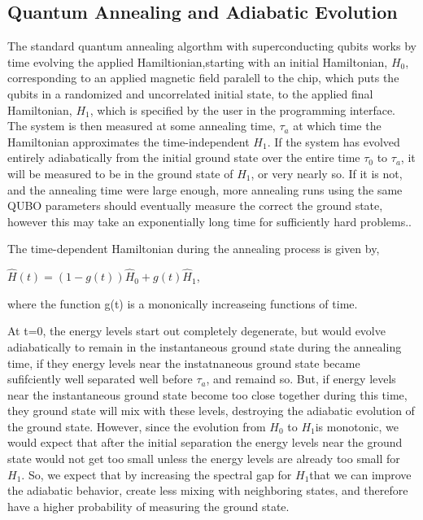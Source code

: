 \documentclass{article}
\begin{document}
\subsection*{Quantum Annealing and Adiabatic Evolution}

The standard quantum annealing algorthm with superconducting qubits works by time evolving the applied Hamiltionian,starting with an initial Hamiltonian,
\(H_0\), corresponding to an applied magnetic field paralell to the chip, which puts the { }qubits in a randomized and uncorrelated initial state,
to the applied final Hamiltonian, \(H_1\), which is specified by the user in the programming interface. The system is then measured at some annealing
time, \(\tau _a\) at which time the Hamiltonian approximates the time-independent \(H_1\). If the system has evolved entirely adiabatically from
the initial ground state over the entire time \(\tau _{0 }\) to \(\tau _a\), it will be measured to be in the ground state of \(H_1\), or very nearly
so. { }If it is not, and the annealing time were large enough, more annealing runs using the same QUBO parameters should eventually measure the correct
the ground state, however this may take an exponentially long time for sufficiently hard problems..

The time-dependent Hamiltonian during the annealing process is given by,

\(\hat{H}(t) = (1-g(t) )\hat{H}_0 + g(t) \hat{H}_1\),

where the function g(t) is a mononically increaseing functions of time.

At t=0, { }the energy levels start out completely degenerate, but would evolve adiabatically to remain in the instantaneous ground state during the
annealing time, if they energy levels near the instatnaneous ground state became sufifciently well separated well before \(\tau _a\), and remaind
so. { }But, if { }energy levels near the instantaneous ground state become too close together during this time, they ground state will mix with these
levels, destroying the adiabatic evolution of the ground state. However, since the evolution from \(H_0\) to \(H_1\)is monotonic, we would expect
that after the initial separation the energy levels near the ground state would not get too small unless the energy levels are already too small
for \(H_1\). { }So, we expect that by increasing the spectral gap for \(H_1\)that we can improve the adiabatic behavior, create less mixing with
neighboring states, and therefore have a higher probability of measuring the ground state.
\end{document}
